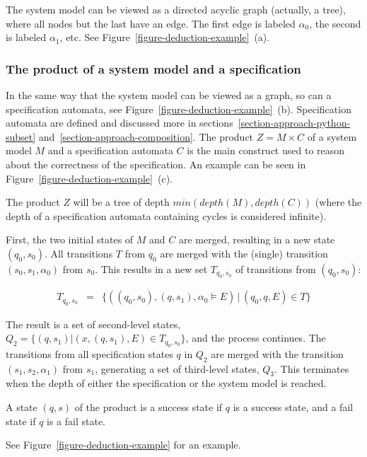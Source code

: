 \documentclass[a4paper,11pt]{kth-mag}
\begin{document}
The system model can be viewed as a directed acyclic graph (actually, a tree),
where all nodes but the last have an edge. The first edge is labeled
$\alpha_0$, the second is labeled $\alpha_1$, etc. See
Figure~\ref{figure-deduction-example}~(a).


\subsubsection{The product of a system model and a specification}

In the same way that the system model can be viewed as a graph, so can a
specification automata, see Figure~\ref{figure-deduction-example}~(b).
Specification automata are defined and discussed more in
sections~\ref{section-approach-python-subset}
and~\ref{section-approach-composition}. The
product $Z = M \times C$ of a system model $M$ and a specification automata $C$
is the main construct used to reason about the correctness of the
specification. An example can be seen in
Figure~\ref{figure-deduction-example}~(c).

The product $Z$ will be a tree of depth $min(depth(M), depth(C))$ (where the
depth of a specification automata containing cycles is considered infinite).

First, the two initial states of $M$ and $C$ are merged, resulting in a new
state $(q_0,s_0)$. All transitions $T$ from $q_0$ are merged with the (single)
transition $(s_0, s_1, \alpha_0)$ from $s_0$. This results in a new set
$T_{q_0,s_0}$ of transitions from $(q_0,s_0)$:

\medskip
\[
  \begin{array}{rcl}
    T_{q_0,s_0} & = & \{((q_0,s_0), (q,s_1), \alpha_0 \models E) \, | \, (q_0, q, E) \in T \}
  \end{array}
\]
\medskip

The result is a set of second-level states, $Q_2 = \{(q,s_1) | (x, (q,s_1),
E) \in T_{q_0,s_0}\}$, and the process continues. The transitions from all
specification states $q$ in $Q_2$ are merged with the transition $(s_1, s_2,
\alpha_1)$ from $s_1$, generating a set of third-level states, $Q_3$. This
terminates when the depth of either the specification or the system model is
reached.

A state $(q, s)$ of the product is a success state if $q$ is a success state,
and a fail state if $q$ is a fail state.

See Figure~\ref{figure-deduction-example} for an example.
\end{document}

